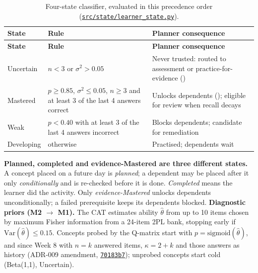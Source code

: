 \documentclass[english]{sintr}
\newcommand{\repourl}{https://github.com/Bhuvan-56/adaptive-learning-path-planner-DAT}
\newcommand{\sha}{cs5903-final-2026}
\DeclareRobustCommand{\rf}[1]{\href{\repourl/blob/\sha/#1}{\nolinkurl{#1}}}
\DeclareRobustCommand{\cm}[1]{\href{\repourl/commit/#1}{\texttt{#1}}}
\begin{document}
{\small
\begin{longtable}{|L{2.09cm}|L{6.47cm}|L{6.47cm}|}
\caption{Four-state classifier, evaluated in this precedence order (\rf{src/state/learner_state.py}).}\\
\hline
\textbf{State} & \textbf{Rule} & \textbf{Planner consequence} \\ \hline
\endfirsthead
\hline \textbf{State} & \textbf{Rule} & \textbf{Planner consequence} \\ \hline
\endhead
Uncertain & $n < 3$ or $\sigma^2 > 0.05$ & Never trusted: routed to assessment or practice-for-evidence () \\ \hline
Mastered & $p \geq 0.85$, $\sigma^2 \leq 0.05$, $n \geq 3$ and at least 3 of the last 4 answers correct & Unlocks dependents (); eligible for review when recall decays \\ \hline
Weak & $p < 0.40$ with at least 3 of the last 4 answers incorrect & Blocks dependents; candidate for remediation \\ \hline
Developing & otherwise & Practised; dependents wait \\ \hline
\end{longtable}
}
\vspace{0.2em}\noindent
\textbf{Planned, completed and evidence-Mastered are three different states.} A concept placed on a future day is \textit{planned}; a dependent may be placed after it only \textit{conditionally} and is re-checked before it is done. \textit{Completed} means the learner did the activity. Only \textit{evidence-Mastered} unlocks dependents unconditionally; a failed prerequisite keeps its dependents blocked.
\vspace{0.2em}\newline
\textbf{Diagnostic priors (M2 $\rightarrow$ M1).} The CAT estimates ability $\hat\theta$ from up to 10 items chosen by maximum Fisher information from a 24-item 2PL bank, stopping early if $\mathrm{Var}(\hat\theta) \leq 0.15$. Concepts probed by the Q-matrix start with $p = \mathrm{sigmoid}(\hat\theta)$, and since Week 8 with $n = k$ answered items, $\kappa = 2 + k$ and those answers as history (ADR-009 amendment, \cm{70183b7}); unprobed concepts start cold (Beta(1,1), Uncertain).
\end{document}
